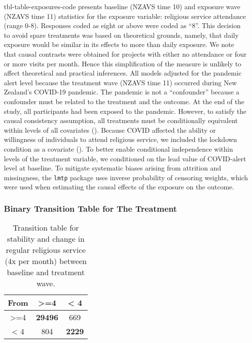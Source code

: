 \documentclass[
  single column]{article}
\begin{document}
tbl-table-exposures-code presents baseline (NZAVS time 10) and exposure
wave (NZAVS time 11) statistics for the exposure variable: religious
service attendance (range 0-8). Responses coded as eight or above were
coded as ``8''. This decision to avoid spare treatments was based on
theoretical grounds, namely, that daily exposure would be similar in its
effects to more than daily exposure. We note that causal contrasts were
obtained for projects with either no attendance or four or more visits
per month. Hence this simplification of the measure is unlikely to
affect theoretical and practical inferences. All models adjusted for the
pandemic alert level because the treatment wave (NZAVS time 11) occurred
during New Zealand's COVID-19 pandemic. The pandemic is not a
``confounder'' because a confounder must be related to the treatment and
the outcome. At the end of the study, all participants had been exposed
to the pandemic. However, to satisfy the causal consistency assumption,
all treatments must be conditionally equivalent within levels of all
covariates (). Because COVID affected the ability or willingness of individuals
to attend religious service, we included the lockdown condition as a
covariate (). To better enable
conditional independence within levels of the treatment variable, we
conditioned on the lead value of COVID-alert level at baseline. To
mitigate systematic biases arising from attrition and missingness, the
\texttt{lmtp} package uses inverse probability of censoring weights,
which were used when estimating the causal effects of the exposure on
the outcome.

\subsubsection{Binary Transition Table for The
Treatment}\label{binary-transition-table-for-the-treatment}

\begin{longtable}[]{@{}ccc@{}}

\caption{\label{tbl-transition-tablegain}Transition table for stability
and change in regular religious service (4x per month) between baseline
and treatment wave.}

\tabularnewline

\toprule\noalign{}
From & \textgreater=4 & \textless{} 4 \\
\midrule\noalign{}
\endhead
\bottomrule\noalign{}
\endlastfoot
\textgreater=4 & \textbf{29496} & 669 \\
\textless{} 4 & 804 & \textbf{2229} \\

\end{longtable}
\end{document}
